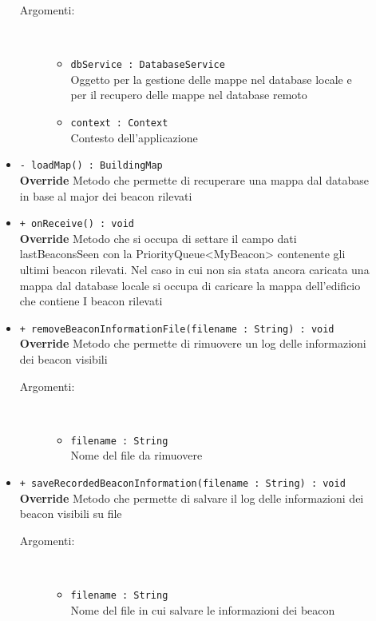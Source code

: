 \documentclass[../DefinizioneDiProdotto.tex]{subfiles}
\begin{document}
\begin{description}
\begin{itemize}
 \begin{description}
\item[Argomenti:] \
\begin{itemize}
\item \texttt{dbService : DatabaseService}\\
Oggetto per la gestione delle mappe nel database locale e per il recupero delle mappe nel database remoto\item \texttt{context : Context}\\
Contesto dell'applicazione\end{itemize}
\end{description}
\item \texttt{- loadMap() : BuildingMap}\\
\textbf{Override} Metodo che permette di recuperare una mappa dal database in base al major dei beacon rilevati
 \item \texttt{+ onReceive() : void}\\
\textbf{Override} Metodo che si occupa di settare il campo dati lastBeaconsSeen con la PriorityQueue<MyBeacon> contenente gli ultimi beacon rilevati. Nel caso in cui non sia stata ancora caricata una mappa dal database locale si occupa di caricare la mappa dell'edificio che contiene I beacon rilevati
 \item \texttt{+ removeBeaconInformationFile(filename : String) : void}\\
\textbf{Override} Metodo che permette di rimuovere un log delle informazioni dei beacon visibili
 \begin{description}
\item[Argomenti:] \
\begin{itemize}
\item \texttt{filename : String}\\
Nome del file da rimuovere\end{itemize}
\end{description}
\item \texttt{+ saveRecordedBeaconInformation(filename : String) : void}\\
\textbf{Override} Metodo che permette di salvare il log delle informazioni dei beacon visibili su file
 \begin{description}
\item[Argomenti:] \
\begin{itemize}
\item \texttt{filename : String}\\
Nome del file in cui salvare le informazioni dei beacon\end{itemize}

\end{description}
\end{itemize}
\end{description}
\end{document}
